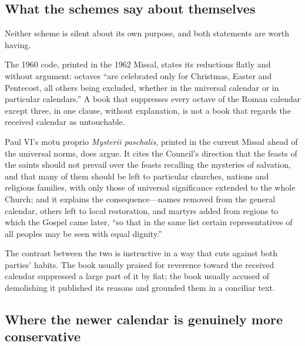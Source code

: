 \subsection{What the schemes say about themselves}

Neither scheme is silent about its own purpose, and both statements are worth having.

The 1960 code, printed in the 1962 Missal, states its reductions flatly and without argument: octaves ``are celebrated only for Christmas, Easter and Pentecost, all others being excluded, whether in the universal calendar or in particular calendars.'' A book that suppresses every octave of the Roman calendar except three, in one clause, without explanation, is not a book that regards the received calendar as untouchable.

Paul VI's motu proprio \emph{Mysterii paschalis}, printed in the current Missal ahead of the universal norms, does argue. It cites the Council's direction that the feasts of the saints should not prevail over the feasts recalling the mysteries of salvation, and that many of them should be left to particular churches, nations and religious families, with only those of universal significance extended to the whole Church; and it explains the consequence---names removed from the general calendar, others left to local restoration, and martyrs added from regions to which the Gospel came later, ``so that in the same list certain representatives of all peoples may be seen with equal dignity.''

The contrast between the two is instructive in a way that cuts against both parties' habits. The book usually praised for reverence toward the received calendar suppressed a large part of it by fiat; the book usually accused of demolishing it published its reasons and grounded them in a conciliar text.

\subsection{Where the newer calendar is genuinely more conservative}

